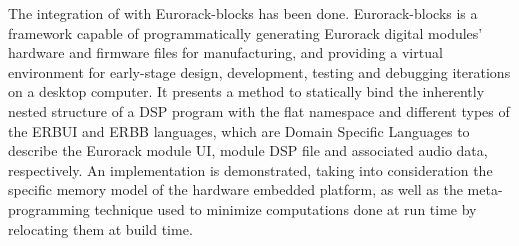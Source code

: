 The integration of \F{} with Eurorack-blocks has been done.
Eurorack-blocks is a framework capable of programmatically generating
Eurorack digital modules' hardware and firmware files for manufacturing,
and providing a virtual environment for early-stage design, development,
testing and debugging iterations on a desktop computer. It presents a
method to statically bind the inherently nested structure of a \F{} DSP
program with the flat namespace and different types of the ERBUI and
ERBB languages, which are Domain Specific Languages to describe the
Eurorack module UI, module DSP file and associated audio data,
respectively. An implementation is demonstrated, taking into
consideration the specific memory model of the hardware embedded
platform, as well as the meta-programming technique used to minimize
computations done at run time by relocating them at build time.
